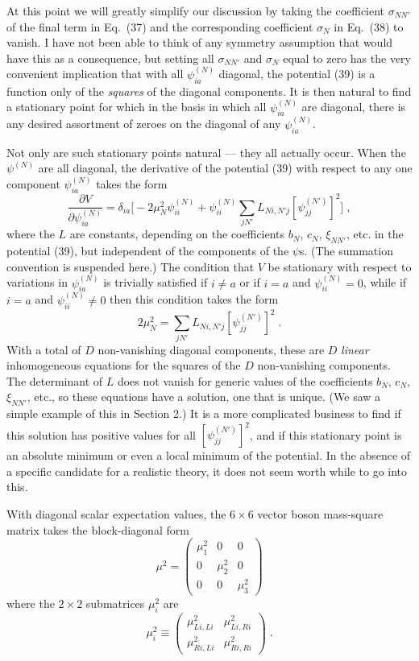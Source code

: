 \documentclass[12pt]{article}
\begin{document}
At this  point we will greatly simplify  our discussion by taking the coefficient $\sigma_{NN'}$ of the final term in Eq.~(37) and the corresponding coefficient $\sigma_N$ in Eq.~(38) to vanish.  I have not been able to think of any symmetry assumption that would have this as a consequence, but setting all $\sigma_{NN'}$ and $\sigma_N$ equal to zero has the very convenient implication that with all $\psi^{(N)}_{ia}$  diagonal, the potential (39) is a function only of the {\em squares} of the diagonal components.  It is then natural to find a stationary point for which  in the basis in which all $\psi^{(N)}_{ia}$  are diagonal, there is  any desired assortment of zeroes on the diagonal of any $\psi^{(N)}_{ia}$.

Not only are such stationary points natural --- they all actually occur.  When the $\psi^{(N)}$ are all diagonal, the derivative of the potential (39) with respect to any one  component $\psi^{(N)}_{ia}$ takes the form
$$\frac{\partial V}{\partial \psi^{(N)}_{ia}}=\delta_{ia}\Big[-2\mu_N^2\psi^{(N)}_{ii}+\psi^{(N)}_{ii}\sum_{jN'}L_{Ni,N'j}[\psi^{(N')}_{jj}]^2\Big]\;,$$
where the $L$ are constants, depending on the coefficients $b_N$, $c_N$, $\xi_{NN'}$, etc. in the potential (39), but independent of the components of the $\psi$s.
(The summation convention is suspended here.)  The condition that $V$ be stationary with respect to variations in  $\psi^{(N)}_{ia}$ is trivially satisfied if $i\neq a$ or if $i=a$ and $\psi^{(N)}_{ii}=0$, while if $i=a$ and 
$\psi^{(N)}_{ii}\neq 0$ then this condition takes the form
$$2\mu_N^2=\sum_{jN'}L_{Ni,N'j}[\psi^{(N')}_{jj}]^2\;.$$
With a total of $D$ non-vanishing diagonal components, these are $D$ {\em linear} inhomogeneous equations for the squares of the $D$ non-vanishing components.  The determinant of $L$ does not vanish for generic values of the coefficients $b_N$, $c_N$, $\xi_{NN'}$, etc., so these equations have a solution, one that is unique. (We saw a simple example of this in Section 2.)  It is a more complicated business to find if this solution has positive values for all $[\psi^{(N')}_{jj}]^2$, and if this stationary point is an absolute minimum or even a local minimum of the potential.  In the absence of a specific candidate for a realistic theory, it does not seem worth while to go into this.



With diagonal  scalar expectation values, the $6\times 6$ vector boson mass-square matrix takes the block-diagonal form
\begin{equation}
\mu^2=\left(\begin{array}{ccc}\mu_1^2 & 0 & 0 \\0 & \mu_2^2 & 0 \\ 0 & 0 & \mu_3^2 \end{array}\right)
\end{equation}
where the $2\times 2$ submatrices $\mu_i^2$ are
\begin{equation}
\mu_i^2\equiv \left(\begin{array}{cc} \mu^2_{Li,Li} & \mu^2_{Li,Ri} \\ \mu^2_{Ri,Li} & \mu^2_{Ri,Ri}\end{array}\right)\;.
\end{equation}
\end{document}
